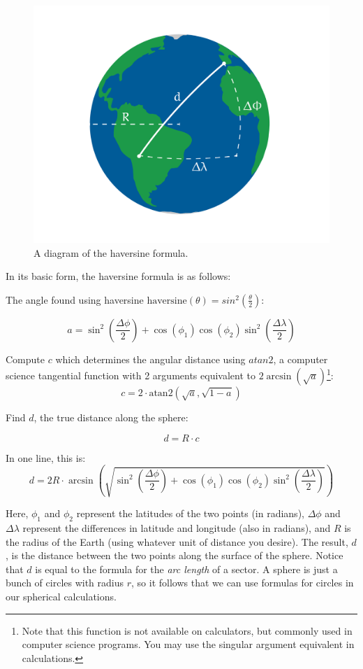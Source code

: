 \begin{figure}[htbp]
    \centering
    \includegraphics[width=\textwidth]{haversine.png}
    \caption{A diagram of the haversine formula.}
    \label{fig:haversine}
\end{figure}


In its basic form, the haversine formula is as follows:

The angle found using haversine $\text{haversine}(\theta) = sin^2\left(\frac{\theta}{2}\right)$:

\[
a = \sin^2\left(\frac{\Delta\phi}{2}\right) + \cos(\phi_1)\cos(\phi_2)\sin^2\left(\frac{\Delta\lambda}{2}\right)
\]

Compute $c$ which determines the angular distance using $atan2$, a computer science tangential function with 2 arguments equivalent to $2 \arcsin(\sqrt{a})$\footnote{Note that this function is not available on calculators, but commonly used in computer science programs. You may use the singular argument equivalent in calculations.}:
\[
c = 2 \cdot \text{atan2} \left( \sqrt{a}, \sqrt{1-a} \right)
\]


Find $d$, the true distance along the sphere:

\[
d = R \cdot c
\]

In one line, this is:
$$
d = 2R \cdot \arcsin\left( \sqrt{\sin^2\left(\frac{\Delta\phi}{2}\right) + \cos(\phi_1) \cos(\phi_2) \sin^2\left(\frac{\Delta\lambda}{2}\right)} \right)
$$

Here, $\phi_1$ and $\phi_2$ represent the latitudes of the two points (in radians),
$\Delta\phi$ and $\Delta\lambda$ represent the differences in latitude
and longitude (also in radians), and $R$ is the radius of the
Earth (using whatever unit of distance you desire). The result, $d$, is the distance between the two points along
the surface of the sphere. Notice that $d$ is equal to the formula for the \emph{arc length} of a sector. 
A sphere is just a bunch of circles with radius $r$, so it follows that we can use formulas for circles in our spherical calculations. 

